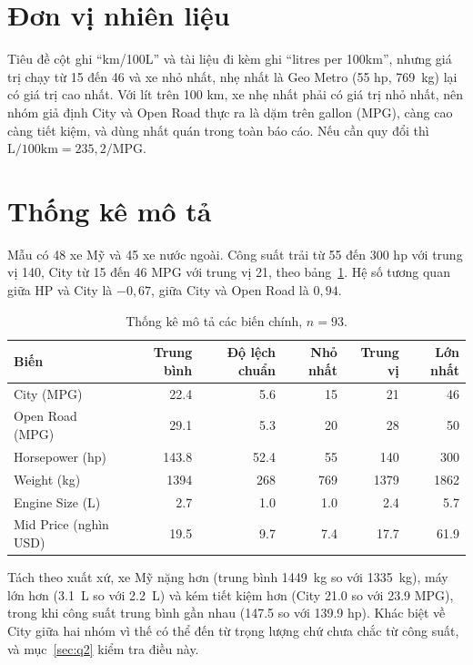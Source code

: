 \documentclass[12pt,a4paper]{report}
\begin{document}
\section{Đơn vị nhiên liệu}
\label{sec:units}

Tiêu đề cột ghi ``km/100L'' và tài liệu đi kèm ghi ``litres per 100km'', nhưng
giá trị chạy từ 15 đến 46 và xe nhỏ nhất, nhẹ nhất là Geo Metro (55 hp,
\SI{769}{kg}) lại có giá trị cao nhất. Với lít trên 100 km, xe nhẹ nhất phải có
giá trị nhỏ nhất, nên nhóm giả định City và Open Road thực ra là dặm trên gallon
(MPG), càng cao càng tiết kiệm, và dùng nhất quán trong toàn báo cáo. Nếu cần
quy đổi thì $\text{L/100km} = 235{,}2 / \text{MPG}$.

\section{Thống kê mô tả}

Mẫu có 48 xe Mỹ và 45 xe nước ngoài. Công suất trải từ 55 đến 300 hp với trung
vị 140, City từ 15 đến 46 MPG với trung vị 21, theo bảng~\ref{tab:describe}. Hệ
số tương quan giữa HP và City là $-0{,}67$, giữa City và Open Road là $0{,}94$.

\begin{table}[tp]
  \centering
  \caption{Thống kê mô tả các biến chính, $n = 93$.}
  \label{tab:describe}
  \begin{tabular}{lrrrrr}
    \toprule
    Biến & Trung bình & Độ lệch chuẩn & Nhỏ nhất & Trung vị & Lớn nhất \\
    \midrule
    City (MPG)            & \num{22.4} & \num{5.6}  & 15  & 21   & 46 \\
    Open Road (MPG)       & \num{29.1} & \num{5.3}  & 20  & 28   & 50 \\
    Horsepower (hp)       & \num{143.8} & \num{52.4} & 55 & 140  & 300 \\
    Weight (kg)           & \num{1394} & \num{268}  & 769 & \num{1379} & \num{1862} \\
    Engine Size (L)       & \num{2.7}  & \num{1.0}  & \num{1.0} & \num{2.4} & \num{5.7} \\
    Mid Price (nghìn USD) & \num{19.5} & \num{9.7}  & \num{7.4} & \num{17.7} & \num{61.9} \\
    \bottomrule
  \end{tabular}
\end{table}

Tách theo xuất xứ, xe Mỹ nặng hơn (trung bình \SI{1449}{kg} so với
\SI{1335}{kg}), máy lớn hơn (\SI{3.1}{L} so với \SI{2.2}{L}) và kém tiết kiệm
hơn (City \num{21.0} so với \num{23.9} MPG), trong khi công suất trung bình gần
nhau (\num{147.5} so với \num{139.9} hp). Khác biệt về City giữa hai nhóm vì thế
có thể đến từ trọng lượng chứ chưa chắc từ công suất, và mục~\ref{sec:q2} kiểm
tra điều này.
\end{document}
